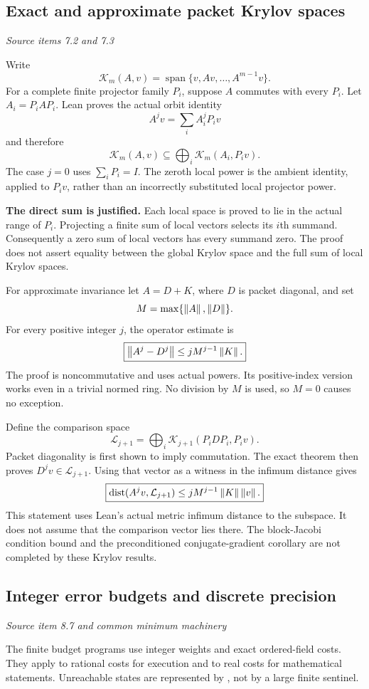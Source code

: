 \subsection{Exact and approximate packet Krylov spaces}\label{supp3:subsection:003}\textit{Source items 7.2 and 7.3}\par
Write
\[
\mathcal K_m(A,v)=\operatorname{span}\{v,Av,\ldots,A^{m-1}v\}.
\]
For a complete finite projector family $P_i$, suppose $A$ commutes with every $P_i$. Let $A_i=P_iAP_i$. Lean proves the actual orbit identity
\[
A^jv=\sum_i A_i^jP_iv
\]
and therefore
\[
\boxed{\mathcal K_m(A,v)\subseteq
\bigoplus_i\mathcal K_m(A_i,P_iv).}
\]
The case $j=0$ uses $\sum_iP_i=I$. The zeroth local power is the ambient identity, applied to $P_iv$, rather than an incorrectly substituted local projector power.

\textbf{The direct sum is justified.} Each local space is proved to lie in the actual range of $P_i$. Projecting a finite sum of local vectors selects its $i$th summand. Consequently a zero sum of local vectors has every summand zero. The proof does not assert equality between the global Krylov space and the full sum of local Krylov spaces.

For approximate invariance let $A=D+K$, where $D$ is packet diagonal, and set
\[
M=\max\{\left\lVert A\right\rVert,\left\lVert D\right\rVert\}.
\]
For every positive integer $j$, the operator estimate is
\[
\boxed{\left\lVert A^j-D^j\right\rVert\leq jM^{j-1}\left\lVert K\right\rVert.}
\]
The proof is noncommutative and uses actual powers. Its positive-index version works even in a trivial normed ring. No division by $M$ is used, so $M=0$ causes no exception.

Define the comparison space
\[
\mathcal L_{j+1}=\bigoplus_i\mathcal K_{j+1}(P_iDP_i,P_iv).
\]
Packet diagonality is first shown to imply commutation. The exact theorem then proves $D^jv\in\mathcal L_{j+1}$. Using that vector as a witness in the infimum distance gives
\[
\boxed{\operatorname{dist}(A^jv,\mathcal L_{j+1})
\leq jM^{j-1}\norm{K}\norm{v}.}
\]
This statement uses Lean's actual metric infimum distance to the subspace. It does not assume that the comparison vector lies there. The block-Jacobi condition bound and the preconditioned conjugate-gradient corollary are not completed by these Krylov results.



\subsection{Integer error budgets and discrete precision}\label{supp3:subsection:004}\textit{Source item 8.7 and common minimum machinery}\par
The finite budget programs use integer weights and exact ordered-field costs. They apply to rational costs for execution and to real costs for mathematical statements. Unreachable states are represented by , not by a large finite sentinel.

